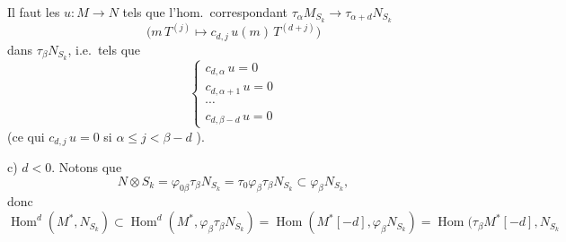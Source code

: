 \documentclass[11pt,a4paper]{article}
\begin{document}
Il faut  les $u : M \to N$ tels que l'hom.\ correspondant
$\tau_\alpha M_{S_k} \to \tau_{\alpha+d} N_{S_k}$
\[
  \bigl( m\, T^{(j)} \longmapsto c_{d,j}\, u(m)\, T^{(d+j)} \bigr)
\]
  \ill{} dans $\tau_\beta N_{S_k}$, i.e.\
tels que
\[
  \begin{cases}
    c_{d, \alpha}\, u = 0 \\
    c_{d, \alpha+1}\, u = 0 \\
    \cdots \\
    c_{d, \beta-d}\, u = 0
  \end{cases}
\]
(ce qui  $c_{d,j}\, u = 0$ si $\alpha \leq j < \beta - d$
\struck{\ill{}}).

c) $d < 0$. Notons que
\[
  N \otimes S_k = \varphi_{0 \beta} \tau_\beta N_{S_k} = \tau_0 \varphi_{\beta} \tau_\beta N_{S_k}
  \subset \varphi_\beta N_{S_k} ,
\]
donc 
\[
  \operatorname{Hom}^d(M^*, N_{S_k}) \subset \operatorname{Hom}^d(M^*, \varphi_\beta \tau_\beta N_{S_k})
  = \operatorname{Hom}(M^*[-d], \varphi_\beta N_{S_k})
  = \operatorname{Hom}(\tau_\beta M^*[-d], N_{S_k}
\]
\end{document}
